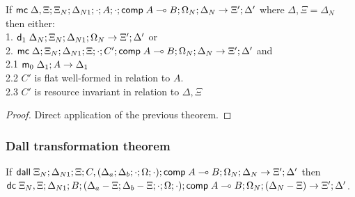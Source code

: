 If $\mathsf{mc} \; \Delta, \Xi; \Xi_N; \Delta_{N1}; \cdot; A; \cdot; \mathsf{comp} \; A \multimap B; \Omega_N; \Delta_N \rightarrow \Xi'; \Delta'$ where $\Delta, \Xi = \Delta_N$ then either:\\
1. \hspace{1cm} $\mathsf{d}_1 \; \Delta_N; \Xi_N; \Delta_{N1}; \Omega_N \rightarrow \Xi'; \Delta'$ or \\
2. \hspace{1cm} $\mathsf{mc} \; \Delta; \Xi_N; \Delta_{N1}; \Xi; \cdot; C'; \mathsf{comp} \; A \multimap B; \Omega_N; \Delta_N \rightarrow \Xi'; \Delta'$ and \\
2.1 \hspace{2cm} $\mathsf{m}_0 \; \Delta_1; A \rightarrow \Delta_1$ \\
2.2 \hspace{2cm} $C'$ is flat well-formed in relation to $A$. \\
2.3 \hspace{2cm} $C'$ is resource invariant in relation to $\Delta, \Xi$ \\

\begin{proof}
Direct application of the previous theorem.
\end{proof}

\subsubsection{Dall transformation theorem}

If $\mathsf{dall} \; \Xi_N; \Delta_{N1}; \Xi; C, (\Delta_a; \Delta_b; \cdot; \Omega; \cdot); \mathsf{comp} \; A \multimap B; \Omega_N; \Delta_N \rightarrow \Xi'; \Delta'$ then\\
$\mathsf{dc} \; \Xi_N, \Xi; \Delta_{N1}; B; (\Delta_a - \Xi; \Delta_b - \Xi; \cdot; \Omega; \cdot); \mathsf{comp} \; A \multimap B; \Omega_N; (\Delta_N - \Xi) \rightarrow \Xi'; \Delta'$.

